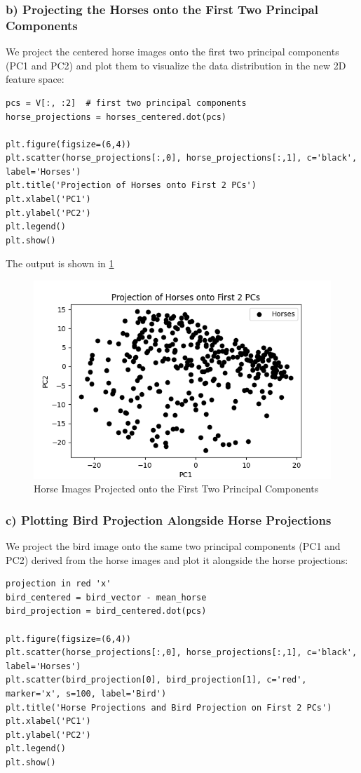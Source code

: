\documentclass{article}
\begin{document}
\subsubsection*{b) Projecting the Horses onto the First Two Principal Components}

We project the centered horse images onto the first two principal components (PC1 and PC2) and plot them to visualize the data distribution in the new 2D feature space:

\begin{verbatim}
pcs = V[:, :2]  # first two principal components
horse_projections = horses_centered.dot(pcs)

plt.figure(figsize=(6,4))
plt.scatter(horse_projections[:,0], horse_projections[:,1], c='black', label='Horses')
plt.title('Projection of Horses onto First 2 PCs')
plt.xlabel('PC1')
plt.ylabel('PC2')
plt.legend()
plt.show()
\end{verbatim}

The output is shown in \ref{fig:horse_projections}

\begin{figure}[ht]
    \centering
    \includegraphics[width=.6\textwidth]{horse_projections.png}
    \caption{Horse Images Projected onto the First Two Principal Components}
    \label{fig:horse_projections}
\end{figure}
\newpage
\subsubsection*{c) Plotting Bird Projection Alongside Horse Projections}

We project the bird image onto the same two principal components (PC1 and PC2) derived from the horse images and plot it alongside the horse projections:

\begin{verbatim}projection in red 'x'
bird_centered = bird_vector - mean_horse
bird_projection = bird_centered.dot(pcs)

plt.figure(figsize=(6,4))
plt.scatter(horse_projections[:,0], horse_projections[:,1], c='black', label='Horses')
plt.scatter(bird_projection[0], bird_projection[1], c='red', marker='x', s=100, label='Bird')
plt.title('Horse Projections and Bird Projection on First 2 PCs')
plt.xlabel('PC1')
plt.ylabel('PC2')
plt.legend()
plt.show()
\end{verbatim}
\end{document}
